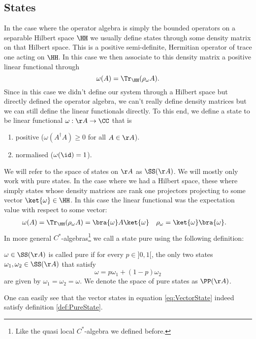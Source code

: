 \subsection{States}
In the case where the operator algebra is simply the bounded operators on a separable Hilbert space $\HH$ we usually define states through some density matrix on that Hilbert space. This is a positive semi-definite, Hermitian operator of trace one acting on $\HH$. In this case we then associate to this density matrix a positive linear functional through
\begin{equation}
\omega(A)= \Tr_\HH(\rho_\omega A).
\end{equation}
Since in this case we didn't define our system through a Hilbert space but directly defined the operator algebra, we can't really define density matrices but we can still define the linear functionals directly. To this end, we define a state to be linear functional $\omega:\AA\rightarrow \CC$ that is
\begin{enumerate}
	\item positive ($\omega(A^\dagger A)\geq 0$ for all $A\in\AA$).
	\item normalised ($\omega(\id)=1$).
\end{enumerate}
We will refer to the space of states on $\AA$ as $\SS(\AA)$. We will mostly only work with pure states. In the case where we had a Hilbert space, these where simply states whose density matrices are rank one projectors projecting to some vector $\ket{\omega}\in\HH$. In this case the linear functional was the expectation value with respect to some vector:
\begin{align}\label{eq:VectorState}
\omega(A)&=\Tr_\HH(\rho_\omega A)=\bra{\omega}A\ket{\omega}&\rho_\omega&=\ket{\omega}\bra{\omega}.
\end{align}
In more general $C^*$-algebras\footnote{Like the quasi local $C^*$-algebra we defined before.} we call a state pure using the following definition:
\begin{definition}[pure]\label{def:PureState}
	$\omega\in\SS(\AA)$ is called pure if for every $p\in]0,1[$, the only two states $\omega_1,\omega_2\in\SS(\AA)$ that satisfy
	\begin{equation}
	\omega=p\omega_1+(1-p)\omega_2
	\end{equation}
	are given by $\omega_1=\omega_2=\omega$. We denote the space of pure states as $\PP(\AA)$.
\end{definition}
One can easily see that the vector states in equation \eqref{eq:VectorState} indeed satisfy definition \ref{def:PureState}.
